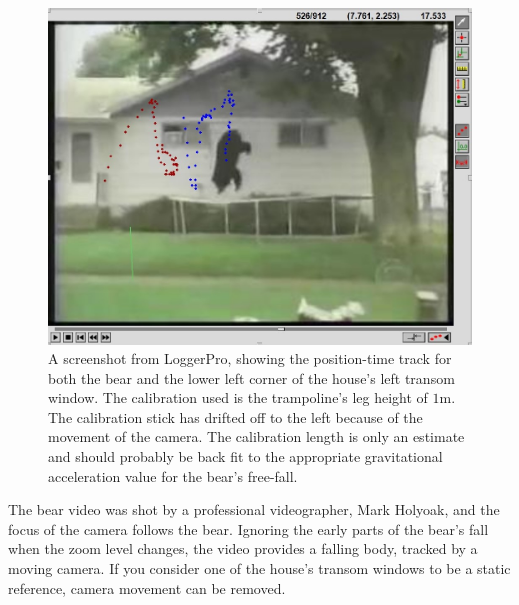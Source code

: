 \documentclass[12pt]{iopart}
\begin{document}
\begin{figure}[h]
\centering
\includegraphics[width=\columnwidth]{figure_6_bear-dots.jpg}
\caption{
A screenshot from LoggerPro, showing the position-time track for both the bear and the lower left corner of the house's left transom window. The calibration used is the trampoline's leg height of $1$m.  The calibration stick has drifted off to the left because of the movement of the camera.  The calibration length is only an estimate and should probably be back fit to the appropriate gravitational acceleration value for the bear's free-fall.
}
\label{bear-dots}
\end{figure}

The bear video was shot by a professional videographer, Mark Holyoak, and the focus of the camera follows the bear.  Ignoring the early parts of the bear's fall when the zoom level changes, the video provides a falling body, tracked by a moving camera.  If you consider one of the house's transom windows to be a static reference, camera movement can be removed.
\end{document}
